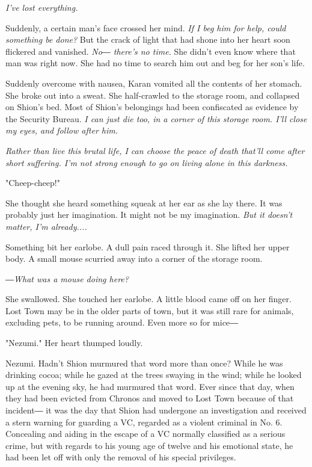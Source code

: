 \emph{I've lost everything.}

Suddenly, a certain man's face crossed her mind. \emph{If I beg him for help,
	could something be done?} But the crack of light that had shone into her
heart soon flickered and vanished. \emph{No― there's no time.} She didn't even
know where that man was right now. She had no time to search him out and
beg for her son's life.

Suddenly overcome with nausea, Karan vomited all the contents of her
stomach. She broke out into a sweat. She half-crawled to the storage
room, and collapsed on Shion's bed. Most of Shion's belongings had been
confiscated as evidence by the Security Bureau.\emph{ I can just die too, in a
	corner of this storage room. I'll close my eyes, and follow after him.}

\emph{Rather than live this brutal life, I can choose the peace of death
	that'll come after short suffering. I'm not strong enough to go on
	living alone in this darkness.}

"Cheep-cheep!"

She thought she heard something squeak at her ear as she lay there. It
was probably just her imagination. It might not be my imagination. \emph{But
	it doesn't matter, I'm already....}

Something bit her earlobe. A dull pain raced through it. She lifted her
upper body. A small mouse scurried away into a corner of the storage
room.

\emph{―What was a mouse doing here?}

She swallowed. She touched her earlobe. A little blood came off on her
finger. Lost Town may be in the older parts of town, but it was still
rare for animals, excluding pets, to be running around. Even more so for
mice―

"Nezumi." Her heart thumped loudly.

Nezumi. Hadn't Shion murmured that word more than once? While he was
drinking cocoa; while he gazed at the trees swaying in the wind; while
he looked up at the evening sky, he had murmured that word. Ever since
that day, when they had been evicted from Chronos and moved to Lost Town
because of that incident― it was the day that Shion had undergone an
investigation and received a stern warning for guarding a VC, regarded
as a violent criminal in No. 6. Concealing and aiding in the escape of a
VC normally classified as a serious crime, but with regards to his young
age of twelve and his emotional state, he had been let off with only the
removal of his special privileges.

